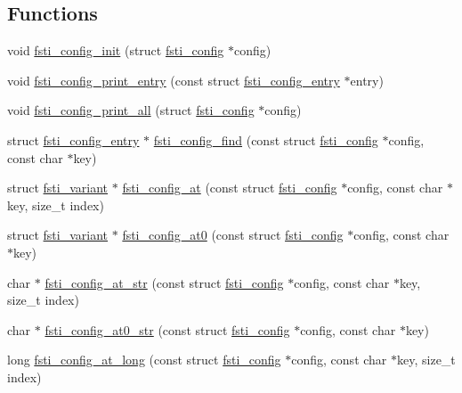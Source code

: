 \subsection*{Functions}
\begin{DoxyCompactItemize}
\item 
void \mbox{\hyperlink{fsti-config_8h_abf23f5142b201c8f6e9db888be75f924}{fsti\+\_\+config\+\_\+init}} (struct \mbox{\hyperlink{structfsti__config}{fsti\+\_\+config}} $\ast$config)
\item 
void \mbox{\hyperlink{fsti-config_8h_acc33ddba0191f4d6013a23e52e0b16c2}{fsti\+\_\+config\+\_\+print\+\_\+entry}} (const struct \mbox{\hyperlink{structfsti__config__entry}{fsti\+\_\+config\+\_\+entry}} $\ast$entry)
\item 
void \mbox{\hyperlink{fsti-config_8h_a0ac007ff2f6adaabfb434a239cf36b6c}{fsti\+\_\+config\+\_\+print\+\_\+all}} (struct \mbox{\hyperlink{structfsti__config}{fsti\+\_\+config}} $\ast$config)
\item 
struct \mbox{\hyperlink{structfsti__config__entry}{fsti\+\_\+config\+\_\+entry}} $\ast$ \mbox{\hyperlink{fsti-config_8h_a83fb2b9e2caaf46ab1c6ff13c618718f}{fsti\+\_\+config\+\_\+find}} (const struct \mbox{\hyperlink{structfsti__config}{fsti\+\_\+config}} $\ast$config, const char $\ast$key)
\item 
struct \mbox{\hyperlink{structfsti__variant}{fsti\+\_\+variant}} $\ast$ \mbox{\hyperlink{fsti-config_8h_a7e65ede372ff1c72a9eb5e6c26f499e4}{fsti\+\_\+config\+\_\+at}} (const struct \mbox{\hyperlink{structfsti__config}{fsti\+\_\+config}} $\ast$config, const char $\ast$key, size\+\_\+t index)
\item 
struct \mbox{\hyperlink{structfsti__variant}{fsti\+\_\+variant}} $\ast$ \mbox{\hyperlink{fsti-config_8h_a720dc18f76126042749bd5bab32fcc14}{fsti\+\_\+config\+\_\+at0}} (const struct \mbox{\hyperlink{structfsti__config}{fsti\+\_\+config}} $\ast$config, const char $\ast$key)
\item 
char $\ast$ \mbox{\hyperlink{fsti-config_8h_aa51f915ff212933ab1b10a22b82b1464}{fsti\+\_\+config\+\_\+at\+\_\+str}} (const struct \mbox{\hyperlink{structfsti__config}{fsti\+\_\+config}} $\ast$config, const char $\ast$key, size\+\_\+t index)
\item 
char $\ast$ \mbox{\hyperlink{fsti-config_8h_a50a8eef9690263f45e229ce63cdefbfc}{fsti\+\_\+config\+\_\+at0\+\_\+str}} (const struct \mbox{\hyperlink{structfsti__config}{fsti\+\_\+config}} $\ast$config, const char $\ast$key)
\item 
long \mbox{\hyperlink{fsti-config_8h_a66e20fd6ac731a2183f5f303d9707058}{fsti\+\_\+config\+\_\+at\+\_\+long}} (const struct \mbox{\hyperlink{structfsti__config}{fsti\+\_\+config}} $\ast$config, const char $\ast$key, size\+\_\+t index)

\end{DoxyCompactItemize}

